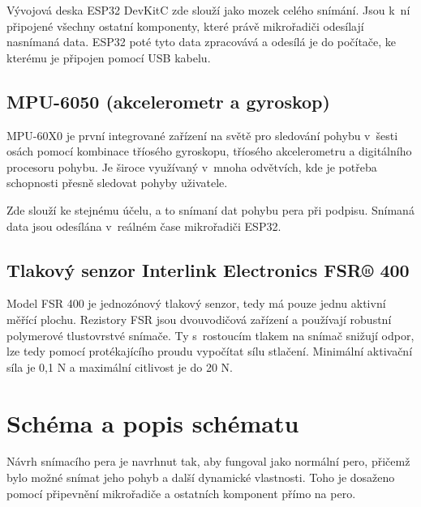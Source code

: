Vývojová deska ESP32 DevKitC zde slouží jako mozek celého snímání.                                   %
Jsou k~ní připojené všechny ostatní komponenty, které právě mikrořadiči odesílají nasnímaná data.    %
ESP32 poté tyto data zpracovává a odesílá je do počítače, ke kterému je připojen  pomocí USB kabelu. %

\subsection*{MPU-6050 (akcelerometr a gyroskop)}
MPU-60X0 je první integrované zařízení na světě pro sledování pohybu v~šesti osách pomocí           %
kombinace tříosého gyroskopu, tříosého akcelerometru a digitálního procesoru pohybu.                %
Je široce využívaný v~mnoha odvětvích, kde je potřeba schopnosti přesně sledovat pohyby uživatele.~\cite{InvenSense2015}%

Zde slouží ke stejnému účelu, a to snímaní dat pohybu pera při podpisu. %
Snímaná data jsou odesílána v~reálném čase mikrořadiči ESP32.           %

\subsection*{Tlakový senzor Interlink Electronics FSR® 400}
Model FSR 400 je jednozónový tlakový senzor, tedy má pouze jednu aktivní měřící plochu.                      %
Rezistory FSR jsou dvouvodičová zařízení a používají robustní polymerové tlustovrstvé snímače.               %
Ty s~rostoucím tlakem na snímač snižují odpor, lze tedy pomocí protékajícího proudu vypočítat sílu stlačení. %
Minimální aktivační síla je 0,1 N a maximální citlivost je do 20 N.~\cite{InterlinkElectronicsFSR400}        %

\section{Schéma a popis schématu}
Návrh snímacího pera %
je navrhnut tak, aby fungoval jako normální pero, 
přičemž bylo možné snímat jeho pohyb a další dynamické vlastnosti.
Toho je dosaženo pomocí připevnění mikrořadiče a ostatních komponent přímo na pero.


